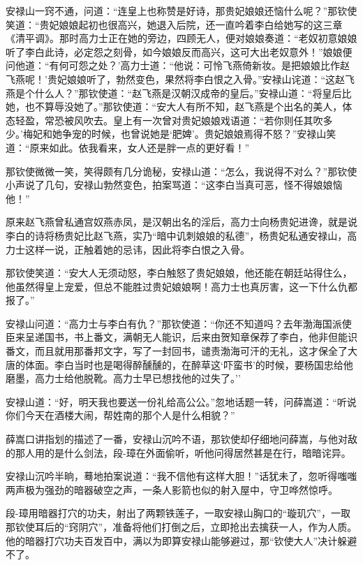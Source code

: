 \documentclass[12pt,oneside]{book}
\begin{document}
安禄山一窍不通，问道：``连皇上也称赞是好诗，那贵妃娘娘还恼什么呢？''那钦使笑道：``贵妃娘娘起初也很高兴，她退入后院，还一直吟着李白给她写的这三章《清平调》。那时高力士正在她的旁边，四顾无人，便对娘娘奏道：``老奴初意娘娘听了李白此诗，必定怨之刻骨，如今娘娘反而高兴，这可大出老奴意外！''娘娘便问他道：``有何可怨之处？'高力士道：``他说：可怜飞燕倚新妆。是把娘娘比作赵飞燕呢！'贵妃娘娘听了，勃然变色，果然将李白恨之入骨。''安禄山诧道：``这赵飞燕是个什么人？''那钦使道：``赵飞燕是汉朝汉成帝的皇后。''安禄山道：``将皇后比她，也不算辱没她了。''那钦使道：``安大人有所不知，赵飞燕是个出名的美人，体态轻盈，常恐被风吹去。皇上有一次曾对贵妃娘娘戏语道：``若你则任其吹多少。'梅妃和她争宠的时候，也曾说她是`肥婢'。贵妃娘娘焉得不怒？''安禄山笑道：``原来如此。依我看来，女人还是胖一点的更好看！''

那钦使微微一笑，笑得颇有几分诡秘，安禄山道：``怎么，我说得不对么？''那钦使小声说了几句，安禄山勃然变色，拍案骂道：``这李白当真可恶，怪不得娘娘恼他！''

原来赵飞燕曾私通宫奴燕赤凤，是汉朝出名的淫后，高力士向杨贵妃进谗，就是说李白的诗将杨贵妃比赵飞燕，实乃``暗中讥刺娘娘的私德''，杨贵妃私通安禄山，高力士这样一说，正触着她的忌讳，因此将李白恨之入骨。

那钦使笑道：``安大人无须动怒，李白触怒了贵妃娘娘，他还能在朝廷站得住么，他虽然得皇上宠爱，但总不能胜过贵妃娘娘啊！高力士也真厉害，这一下什么仇都报了。''

安禄山问道：``高力士与李白有仇？''那钦使道：``你还不知道吗？去年渤海国派使臣来呈递国书，书上番文，满朝无人能识，后来由贺知章保荐了李白，他非但能识番文，而且就用那番邦文字，写了一封回书，谴责渤海可汗的无礼，这才保全了大唐的体面。李白当时也是喝得醉醺醺的，在醉草这`吓蛮书'的时候，要杨国忠给他磨墨，高力士给他脱靴。高力士早已想找他的过失了。''

安禄山道：``好，明天我也要送一份礼给高公公。''忽地话题一转，问薛嵩道：``听说你们今天在酒楼大闹，帮姓南的那个人是什么相貌？''

薛嵩口讲指划的描述了一番，安禄山沉吟不语，那钦使却仔细地问薛嵩，与他对敌的那人用的是什么剑法，段-璋在外面偷听，听他问得居然甚是在行，暗暗诧异。

安禄山沉吟半晌，蓦地拍案说道：``我不信他有这样大胆！''话犹未了，忽听得嗤嗤两声极为强劲的暗器破空之声，一条人影箭也似的射入屋中，守卫哗然惊呼。

段-璋用暗器打穴的功夫，射出了两颗铁莲子，一取安禄山胸口的``璇玑穴''，一取那钦使耳后的``窍阴穴''，准备将他们打倒之后，立即抢出去擒获一人，作为人质。他的暗器打穴功夫百发百中，满以为即算安禄山能够避过，那``钦使大人''决计躲避不了。
\end{document}
